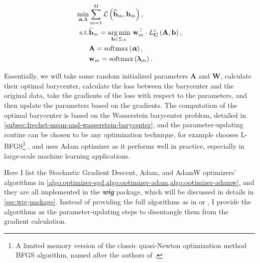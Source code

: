 \begin{equation}\label{eqn:wasserstein-dictionary-problem-unconstrained}
  \begin{aligned}
    \min_{\boldsymbol\upalpha, \boldsymbol\uplambda}
     &
    \sum_{m = 1}^M \mathcal{L} \left(\widehat{\mathbf{b}}_m, \mathbf{b}_m\right),             \\
    \text{s.t.}
     & \widehat{\mathbf{b}}_m =
    \operatorname*{arg\,min}_{\mathbf{b} \in \Sigma_N}\,
    \mathbf{w}_{m}^\top \cdot L_{\mathbf{C}}^\varepsilon \left(\mathbf{A}, \mathbf{b}\right), \\
     & \mathbf{A} = \text{softmax} \left(\boldsymbol\upalpha\right),                          \\
     & \mathbf{w}_m = \text{softmax} \left(\boldsymbol\uplambda_m\right).
  \end{aligned}
\end{equation}


Essentially, we will take some random initialized parameters $\mathbf{A}$ and $\mathbf{W}$,
calculate their optimal barycenter,
calculate the loss between the barycenter and the original data,
take the gradients of the loss with respect to the parameters,
and then update the parameters based on the gradients.
The computation of the optimal barycenter is based on the Wasserstein barycenter problem,
detailed in \cref{subsec:frechet-mean-and-wasserstein-barycenter},
and the parameter-updating routine can be chosen to be any optimization technique,
for example \citet{schmitz2018} chooses L-BFGS\footnote{
  A limited memory version of the classic quasi-Newton optimization method BFGS algorithm,
  named after the authors of \citet{broyden1970,fletcher1970,goldfarb1970,shanno1970}.
} \citep{liu1989},
and \citet{xie2020} uses Adam \citep{kingma2015} optimizer as it performs well in practice,
especially in large-scale machine learning applications.



Here I list the Stochastic Gradient Descent, Adam, and AdamW optimizers' algorithms
in \cref{algo:optimizer-sgd,algo:optimizer-adam,algo:optimizer-adamw},
and they are all implemented in the \textit{\textbf{wig}} package,
which will be discussed in details in \cref{sec:wig-package}.
Instead of providing the full algorithms as in
\citet[Algorithm 1]{kingma2015} or \citet[Algorithm 2]{loshchilov2019},
I provide the algorithms as the parameter-updating steps to disentangle
them from the gradient calculation.


